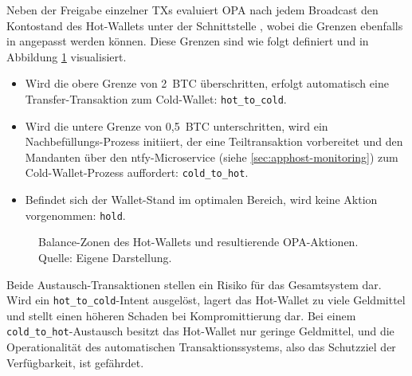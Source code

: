 Neben der Freigabe einzelner \acp{TX} evaluiert \ac{OPA} nach jedem Broadcast den Kontostand des Hot-Wallets unter der Schnittstelle , wobei die Grenzen ebenfalls in  angepasst werden können. Diese Grenzen sind wie folgt definiert und in Abbildung \ref{fig:balance_zonen} visualisiert.
\begin{itemize}
    \item Wird die obere Grenze von 2~\ac{BTC} überschritten, erfolgt automatisch eine Transfer-Transaktion zum Cold-Wallet: \texttt{hot\_to\_cold}.
    \item Wird die untere Grenze von 0,5~\ac{BTC} unterschritten, wird ein Nachbefüllungs-Prozess initiiert, der eine Teiltransaktion vorbereitet und den Mandanten über den ntfy-Microservice (siehe \ref{sec:apphost-monitoring}) zum Cold-Wallet-Prozess auffordert: \texttt{cold\_to\_hot}.
    \item Befindet sich der Wallet-Stand im optimalen Bereich, wird keine Aktion vorgenommen: \texttt{hold}.
\end{itemize}

\begin{figure}[htbp]
\centering
{}
\caption{Balance-Zonen des Hot-Wallets und resultierende \ac{OPA}-Aktionen.\\Quelle: Eigene Darstellung.}
\label{fig:balance_zonen}
\end{figure}

Beide Austausch-Transaktionen stellen ein Risiko für das Gesamtsystem dar. Wird ein \texttt{hot\_to\_cold}-Intent ausgelöst, lagert das Hot-Wallet zu viele Geldmittel und stellt einen höheren Schaden bei Kompromittierung dar. Bei einem \texttt{cold\_to\_hot}-Austausch besitzt das Hot-Wallet nur geringe Geldmittel, und die Operationalität des automatischen Transaktionssystems, also das Schutzziel der Verfügbarkeit, ist gefährdet.

